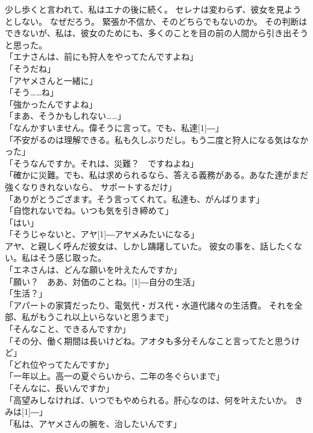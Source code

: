 \documentclass[../IHMain]{subfiles}
\begin{document}
少し歩くと言われて、私はエナの後に続く。
セレナは変わらず、彼女を見ようとしない。
なぜだろう。
緊張か不信か、そのどちらでもないのか。
その判断はできないが、私は、彼女のためにも、多くのことを目の前の人間から引き出そうと思った。\\
「エナさんは、前にも狩人をやってたんですよね」\\
「そうだね」\\
「アヤメさんと一緒に」\\
「そう……ね」\\
「強かったんですよね」\\
「まあ、そうかもしれない……」\\
「なんかすいません。偉そうに言って。でも、私達\scalebox{3}[1]{―}」\\
「不安がるのは理解できる。私も久しぶりだし。もう二度と狩人になる気はなかった」\\
「そうなんですか。それは、災難？　ですねよね」\\
「確かに災難。でも、私は求められるなら、答える義務がある。あなた達がまだ強くなりきれないなら、
サポートするだけ」\\
「ありがとうござます。そう言ってくれて。私達も、がんばります」\\
「自惚れないでね。いつも気を引き締めて」\\
「はい」\\
「そうじゃないと、アヤ\scalebox{3}[1]{―}アヤメみたいになる」\\
アヤ、と親しく呼んだ彼女は、しかし躊躇していた。
彼女の事を、話したくない。私はそう感じ取った。\\
「エネさんは、どんな願いを叶えたんですか」\\
「願い？　ああ、対価のことね。\scalebox{3}[1]{―}自分の生活」\\
「生活？」\\
「アパートの家賃だったり、電気代・ガス代・水道代諸々の生活費。
それを全部、私がもうこれ以上いらないと思うまで」\\
「そんなこと、できるんですか」\\
「その分、働く期間は長いけどね。アオタも多分そんなこと言ってたと思うけど」\\
「どれ位やってたんですか」\\
「一年以上。高一の夏ぐらいから、二年の冬ぐらいまで」\\
「そんなに、長いんですか」\\
「高望みしなければ、いつでもやめられる。肝心なのは、何を叶えたいか。
きみは\scalebox{3}[1]{―}」\\
「私は、アヤメさんの腕を、治したいんです」\\
\end{document}
